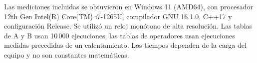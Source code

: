 Las mediciones incluidas se obtuvieron en Windows 11 (AMD64), con procesador 12th Gen Intel(R) Core(TM) i7-1265U, compilador GNU 16.1.0, C++17 y configuración Release. Se utilizó un reloj monótono de alta resolución. Las tablas de A y B usan 10\,000 ejecuciones; las tablas de operadores usan \RepeticionesExperimento{} ejecuciones medidas precedidas de un calentamiento. Los tiempos dependen de la carga del equipo y no son constantes matemáticas.
